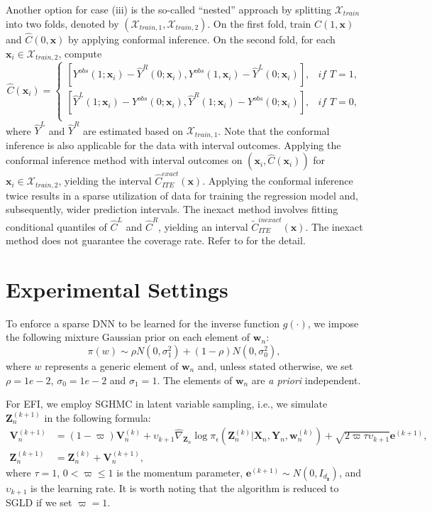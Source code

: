 \documentclass[11pt]{article}
\newcommand{\bX}{{\boldsymbol X}}
\newcommand{\bY}{{\boldsymbol Y}}
\newcommand{\bx}{{\boldsymbol x}}
\newcommand{\bz}{{\boldsymbol z}}
\newcommand{\bZ}{{\boldsymbol Z}}
\newcommand{\be}{{\boldsymbol e}}
\newcommand{\bw}{{\boldsymbol w}}
\newcommand{\bV}{{\boldsymbol V}}
\begin{document}
Another option for case (iii) is the so-called ``nested'' approach by 
splitting $\mathcal{X}_{train}$ into two folds, denoted by $(\mathcal{X}_{train,1},\mathcal{X}_{train,2})$.
On the first fold, train $\hat{C}(1,\bx)$ and $\hat{C}(0,\bx)$ by applying 
conformal inference. On the second fold, 
for each $\bx_i\in \mathcal{X}_{train,2}$, compute  
\[
    \hat{C}(\bx_i) =\begin{cases} 
     [Y^{obs}(1;\bx_i)-\hat{Y}^R(0;\bx_i),Y^{obs}(1,\bx_i)-\hat{Y}^L(0;\bx_i)], &  \textit{if \ } T=1, \\
     [\hat{Y}^L(1;\bx_i)-Y^{obs}(0;\bx_i),\hat{Y}^R(1;\bx_i)-Y^{obs}(0;\bx_i)], &  \textit{if \ } T=0, \\
\end{cases}
\]
where $\hat{Y}^L$  and $\hat{Y}^R$ are estimated based on $\mathcal{X}_{train,1}$. Note that the conformal inference is also applicable for the data with interval outcomes. 
Applying the conformal inference method with interval outcomes on $(\bx_i,\hat{C}(\bx_i))$ for $\bx_i\in \mathcal{X}_{train,2}$,  yielding the interval $\hat{C}^{exact}_{ITE}(\bx)$. 
Applying the conformal inference twice results in a sparse utilization of data for training the regression model and, subsequently, wider prediction intervals. The inexact method involves fitting conditional quantiles of $\hat{C}^L$ and $\hat{C}^R$, yielding an interval $\tilde{C}_{ITE}^{inexact}(\bx)$. The inexact method does not guarantee the coverage rate. Refer to \cite{lei2021ite} for the detail. 



\section{Experimental Settings} \label{parasetting}

To enforce a sparse DNN to be learned for the inverse function $g(\cdot)$, we impose 
the following mixture Gaussian prior on each element of $\bw_n$: 
\begin{equation}\label{sparseprior}
    \pi(w)\sim \rho  N(0,\sigma_{1}^2)+(1-\rho)N(0,\sigma_{0}^2),
\end{equation}
where $w$ represents a generic element of $\bw_n$ and, unless stated otherwise, 
we set $\rho=1e-2$, $\sigma_0=1e-2$ and $\sigma_1=1$.
The elements of $\bw_n$ are {\it a priori} independent. 


For EFI, we employ SGHMC in latent variable sampling, i.e., we simulate $\bZ_n^{(k+1)}$ in the following formula: 
\[  
\begin{split}
\bV_n^{(k+1)} &= (1-\varpi) \bV_n^{(k)} +\upsilon_{k+1} \widehat{\nabla}_{\bZ_n} \log \pi_{\epsilon}(\bZ_n^{(k)}|\bX_n,\bY_n,\bw_n^{(k)}) +\sqrt{2 \varpi \tau \upsilon_{k+1}} \be^{(k+1)}, \\
\bZ_n^{(k+1)}&=\bZ_n^{(k)}+\bV_n^{(k+1)}, 
\end{split}
\]
where $\tau=1$, $0<\varpi\leq 1$ is the momentum parameter, $\be^{(k+1)} \sim N(0,I_{d_{\bz}})$, 
and $\upsilon_{k+1}$ is the learning rate.
It is worth noting that the algorithm is reduced to SGLD if we set $\varpi=1$.
\end{document}

